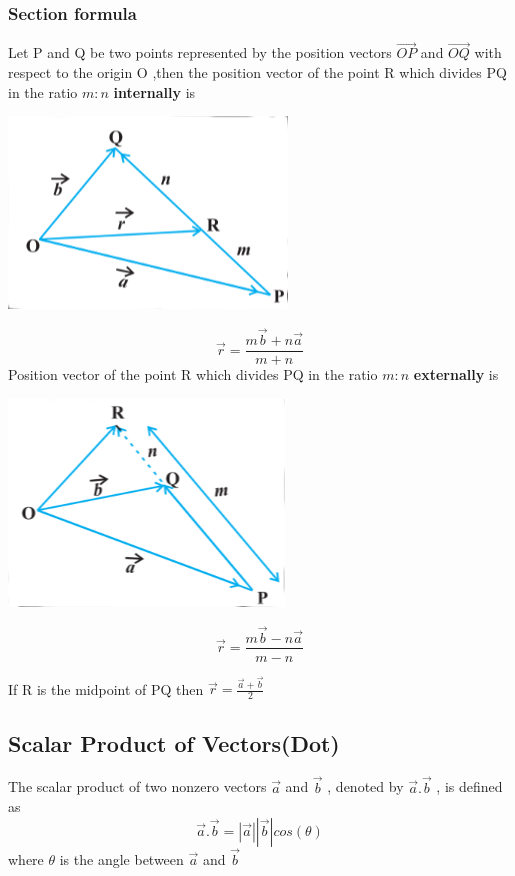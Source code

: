 \documentclass[12pt]{article}
\begin{document}
\begin{multicols*}{2}
\subsubsection*{Section formula}
Let P and Q be two points represented by the position vectors $\vec{OP}$ and $\vec{OQ}$ with respect to the origin O
,then the position vector of the point R which divides PQ in the ratio $m:n$ \textbf{internally}  is
\begin{center}\includegraphics*[scale=0.5]{9.png} \end{center} 
$$\vec{r}=\frac{m\vec{b}+n\vec{a}}{m+n}$$
Position vector of the point R which divides PQ in the ratio $m:n$ \textbf{externally}  is 
\begin{center}
    \includegraphics*[scale=0.5]{10.png}
\end{center}
$$\vec{r}=\frac{m\vec{b}-n\vec{a}}{m-n}$$

If R is the midpoint of PQ then $\vec{r}=\frac{\vec{a}+\vec{b}}{2}$



\subsection*{Scalar Product of Vectors(Dot)} 
The scalar product of two nonzero vectors $\vec{a}$ and $\vec{b}$ , denoted by $\vec{a}.\vec{b}$ , is defined as $$\vec{a}.\vec{b}=|\vec{a}||\vec{b}| cos(\theta)$$ where $\theta$ is the angle between $\vec{a}$ and $\vec{b}$


\end{multicols*}
\end{document}
